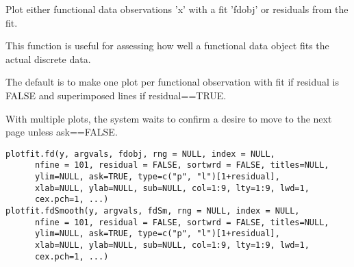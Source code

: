 \begin{Description}\relax
Plot either functional data observations 'x' with a fit 'fdobj' or
residuals from the fit. 

This function is useful for assessing how well a functional data
object fits the actual discrete data.

The default is to make one plot per functional observation with fit
if residual is FALSE and superimposed lines if residual==TRUE.  

With multiple plots, the system waits to confirm a desire to move to
the next page unless ask==FALSE.
\end{Description}
\begin{Usage}
\begin{verbatim}
plotfit.fd(y, argvals, fdobj, rng = NULL, index = NULL,
      nfine = 101, residual = FALSE, sortwrd = FALSE, titles=NULL,
      ylim=NULL, ask=TRUE, type=c("p", "l")[1+residual],
      xlab=NULL, ylab=NULL, sub=NULL, col=1:9, lty=1:9, lwd=1,
      cex.pch=1, ...)
plotfit.fdSmooth(y, argvals, fdSm, rng = NULL, index = NULL,
      nfine = 101, residual = FALSE, sortwrd = FALSE, titles=NULL,
      ylim=NULL, ask=TRUE, type=c("p", "l")[1+residual],
      xlab=NULL, ylab=NULL, sub=NULL, col=1:9, lty=1:9, lwd=1,
      cex.pch=1, ...) 
\end{verbatim}
\end{Usage}

